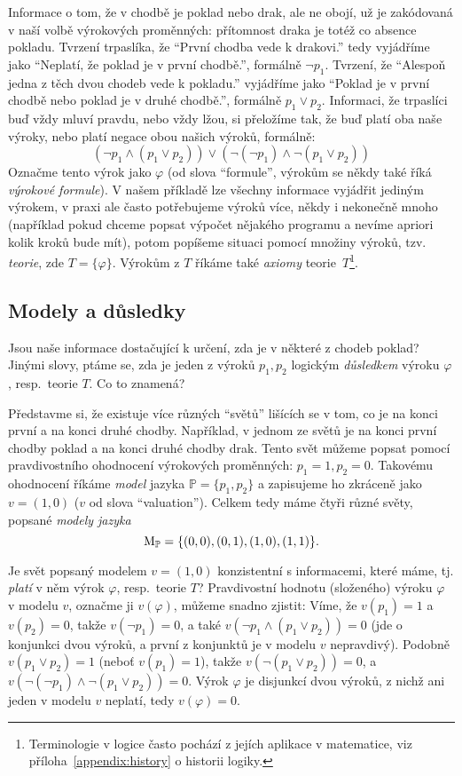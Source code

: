 Informace o tom, že v chodbě je poklad nebo drak, ale ne obojí, už je zakódovaná v naší volbě výrokových proměnných: přítomnost draka je totéž co absence pokladu. Tvrzení trpaslíka, že ``První chodba vede k drakovi.'' tedy vyjádříme jako ``Neplatí, že poklad je v první chodbě.'', formálně \(\neg p_1\). Tvrzení, že ``Alespoň jedna z těch dvou chodeb vede k pokladu.'' vyjádříme jako ``Poklad je v první chodbě nebo poklad je v druhé chodbě.'', formálně \( p_1 \lor p_2\). Informaci, že trpaslíci buď vždy mluví pravdu, nebo vždy lžou, si přeložíme tak, že buď platí oba naše výroky, nebo platí negace obou našich výroků, formálně:
\[
    (\neg p_1 \land (p_1 \lor p_2)) \lor (\neg (\neg p_1) \land \neg (p_1 \lor p_2))
\]
Označme tento výrok jako \( \varphi \) (od slova ``formule'', výrokům se někdy také říká \emph{výrokové formule}). V našem příkladě lze všechny informace vyjádřit jediným výrokem, v praxi ale často potřebujeme výroků více, někdy i nekonečně mnoho (například pokud chceme popsat výpočet nějakého programu a nevíme apriori kolik kroků bude mít), potom popíšeme situaci pomocí množiny výroků, tzv. \emph{teorie}, zde \( T=\{ \varphi \} \). Výrokům z \( T \) říkáme také \emph{axiomy} teorie~\( T \)\footnote{Terminologie v logice často pochází z jejích aplikace v matematice, viz příloha~\ref{appendix:history} o historii logiky.}.

\subsection{Modely a důsledky}

Jsou naše informace dostačující k určení, zda je v některé z chodeb poklad? Jinými slovy, ptáme se, zda je jeden z výroků \( p_1, p_2 \) logickým \emph{důsledkem} výroku \( \varphi \), resp.\ teorie \( T \). Co to znamená?

Představme si, že existuje více různých ``světů'' lišících se v tom, co je na konci první a na konci druhé chodby. Například, v jednom ze světů je na konci první chodby poklad a na konci druhé chodby drak. Tento svět můžeme popsat pomocí pravdivostního ohodnocení výrokových proměnných: \( p_1=1, p_2=0 \). Takovému ohodnocení říkáme \emph{model} jazyka \( \mathbb P=\{p_1,p_2\} \) a zapisujeme ho zkráceně jako \( v = (1,0) \) (\(v\) od slova ``valuation''). Celkem tedy máme čtyři různé světy, popsané \emph{modely jazyka}
\[
    \operatorname{M}_\mathbb P=\{(0,0),(0,1),(1,0),(1,1)\}.
\]

Je svět popsaný modelem \( v = (1,0) \) konzistentní s informacemi, které máme, tj. \emph{platí} v něm výrok \( \varphi \), resp.\ teorie \( T \)? Pravdivostní hodnotu (složeného) výroku \( \varphi \) v modelu \(v\), označme ji \( v(\varphi) \), můžeme snadno zjistit: Víme, že \( v(p_1) = 1 \) a \( v(p_2) = 0 \), takže \( v(\neg p_1) = 0 \), a také \( v(\neg p_1 \land (p_1 \lor p_2))=0 \) (jde o konjunkci dvou výroků, a první z konjunktů je v modelu \( v \) nepravdivý). Podobně \( v(p_1 \lor p_2)=1 \) (neboť \( v(p_1) = 1 \)), takže \( v(\neg(p_1 \lor p_2))=0 \), a \( v(\neg (\neg p_1) \land \neg (p_1 \lor p_2))=0 \). Výrok \( \varphi \) je disjunkcí dvou výroků, z nichž ani jeden v modelu \(v\) neplatí, tedy \( v(\varphi)=0 \).  

